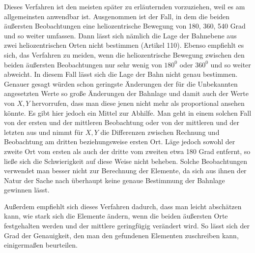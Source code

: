 Dieses Verfahren ist den meisten später zu erläuternden vorzuziehen, weil es am allgemeinsten anwendbar ist. Ausgenommen ist der Fall, in dem die beiden äußersten Beobachtungen eine heliozentrische Bewegung von 180, 360, 540 Grad und so weiter umfassen. Dann lässt sich nämlich die Lage der Bahnebene aus zwei heliozentrischen Orten nicht bestimmen (Artikel 110). Ebenso empfiehlt es sich, das Verfahren zu meiden, wenn die heliozentrische Bewegung zwischen den beiden äußersten Beobachtungen nur sehr wenig von $180^0$ oder $360^0$ und so weiter abweicht. In diesem Fall lässt sich die Lage der Bahn nicht genau bestimmen. Genauer gesagt würden schon geringste Änderungen der für die Unbekannten angesetzten Werte so große Änderungen der Bahnlage und damit auch der Werte von $X,Y$ hervorrufen, dass man diese jenen nicht mehr als proportional ansehen könnte. Es gibt hier jedoch ein Mittel zur Abhilfe. Man geht in einem solchen Fall von der ersten und der mittleren Beobachtung oder von der mittleren und der letzten aus und nimmt für $X,Y$ die Differenzen zwischen Rechnung und Beobachtung am dritten beziehungsweise ersten Ort. Läge jedoch sowohl der zweite Ort vom ersten als auch der dritte vom zweiten etwa 180 Grad entfernt, so ließe sich die Schwierigkeit auf diese Weise nicht beheben. Solche Beobachtungen verwendet man besser nicht zur Berechnung der Elemente, da sich aus ihnen der Natur der Sache nach überhaupt keine genaue Bestimmung der Bahnlage gewinnen lässt.

Außerdem empfiehlt sich dieses Verfahren dadurch, dass man leicht abschätzen kann, wie stark sich die Elemente ändern, wenn die beiden äußersten Orte festgehalten werden und der mittlere geringfügig verändert wird. So lässt sich der Grad der Genauigkeit, den man den gefundenen Elementen zuschreiben kann, einigermaßen beurteilen.
